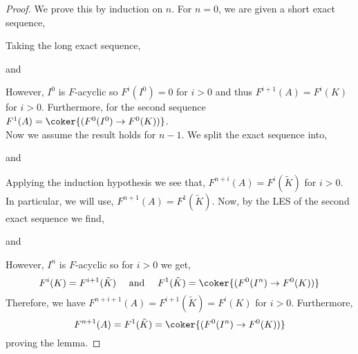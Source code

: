 \documentclass[12pt]{article}
\begin{document}
\begin{proof}
We prove this by induction on $n$. For $n = 0$, we are given a short exact sequence,
\begin{center}
\end{center}
Taking the long exact sequence,
\begin{center}
\end{center}
and
\begin{center}
\end{center}
However, $I^0$ is $F$-acyclic so $F^i(I^0) = 0$ for $i > 0$ and thus $F^{i + 1}(A) = F^i(K)$ for $i > 0$. Furthermore, for the second sequence $F^1(A) = \coker{(F^0(I^0) \to F^0(K))}$. 
\bigskip\\
Now we assume the result holds for $n-1$. We split the exact sequence into,
\begin{center}
\end{center}
and 
\begin{center}
\end{center}
Applying the induction hypothesis we see that,
$F^{n + i}(A) = F^{i}(\tilde{K})$
for $i > 0$. In particular, we will use, $F^{n+1}(A) = F^{1}(\tilde{K})$. Now, by the LES of the second exact sequence we find,
\begin{center}
\end{center}
and
\begin{center}
\end{center}
However, $I^n$ is $F$-acyclic so for $i > 0$ we get,
\[ F^i(K) = F^{i+1}(\tilde{K}) \quad \text{ and } \quad F^1(\tilde{K}) = \coker{(F^0(I^n) \to F^0(K))} \] 
Therefore, we have $F^{n + i + 1}(A) = F^{i+1}(\tilde{K}) = F^i(K)$ for $i > 0$. Furthermore, \[ F^{n+1}(A) = F^1(\tilde{K}) = \coker{(F^0(I^n) \to F^0(K))} \]
proving the lemma.
\end{proof}
\end{document}

